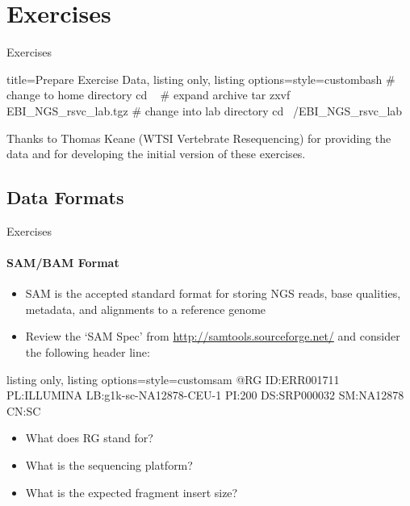 \documentclass{beamer}
\begin{document}


\section{Exercises}

\begin{frame}[fragile]{Exercises}
\begin{tcblisting}{title={Prepare Exercise Data}, listing only, listing options={style=custombash}}
# change to home directory
cd ~
# expand archive
tar zxvf EBI_NGS_rsvc_lab.tgz
# change into lab directory
cd ~/EBI_NGS_rsvc_lab
\end{tcblisting}
\footnotesize{Thanks to Thomas Keane (WTSI Vertebrate Resequencing) for providing the data and for developing the initial version of these exercises. }
\end{frame}



\subsection{Data Formats}
\begin{frame}[fragile]{Exercises}
\framesubtitle{SAM/BAM Format}
\begin{itemize}
\item SAM is the accepted standard format for storing NGS reads, base qualities, metadata, and alignments to a reference genome
\item Review the `SAM Spec' from \url{http://samtools.sourceforge.net/} and consider the following header line: 
\end{itemize}
\begin{tcblisting}{listing only, listing options={style=customsam}}
@RG	ID:ERR001711	PL:ILLUMINA	LB:g1k-sc-NA12878-CEU-1	PI:200	DS:SRP000032	SM:NA12878	CN:SC
\end{tcblisting}
\begin{itemize}
\item What does RG stand for?
\item What is the sequencing platform?
\item What is the expected fragment insert size?
\end{itemize}
\end{frame}
\end{document}
